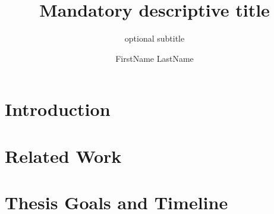 \documentclass{si-msc-proposal}
\author{FirstName LastName}
\title{Mandatory descriptive title}
\subtitle{optional subtitle}
\begin{document}
\maketitle


\section{Introduction}



\section{Related Work}

\section{Thesis Goals and Timeline}


\newpage


\end{document}
